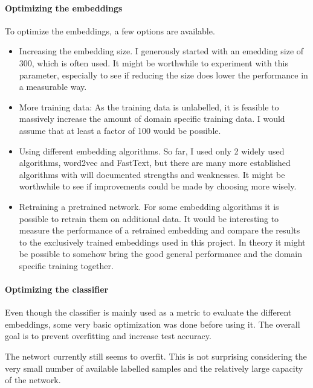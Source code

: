 \documentclass[10pt,a4paper]{article}
\begin{document}
	\paragraph{Optimizing the embeddings}
	To optimize the embeddings, a few options are available.
	\begin{itemize}
		\item Increasing the embedding size. I generously started with an emedding size of 300, which is often used. It might be worthwhile to experiment with this parameter, especially to see if reducing the size does lower the performance in a measurable way. 
		\item More training data: As the training data is unlabelled, it is feasible to massively increase the amount of domain specific training data. I would assume that at least a factor of 100 would be possible.
		\item Using different embedding algorithms. So far, I used only 2 widely used algorithms, word2vec and FastText, but there are many more established algorithms with will documented strengths and weaknesses. It might be worthwhile to see if improvements could be made by choosing more wisely.
		\item Retraining a pretrained network. For some embedding algorithms it is possible to retrain them on additional data. It would be interesting to measure the performance of a retrained embedding and compare the results to the exclusively trained embeddings used in this project. In theory it might be possible to somehow bring the good general performance and the domain specific training together.
	\end{itemize}
	
	
	\paragraph{Optimizing the classifier}
	Even though the classifier is mainly used as a metric to evaluate the different embeddings, some very basic optimization was done before using it. The overall goal is to prevent overfitting and increase test accuracy. 
	
	The networt currently still seems to overfit. This is not surprising considering the very small number of available labelled samples and the relatively large capacity of the network.
	
\end{document}
